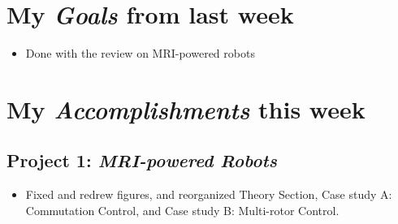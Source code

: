 \newcommand{\handoutName}{Weekly report}
\newcommand{\handoutdate}{\today}
\newcommand{\duedate}{}



\section{My \emph{Goals} from last week}
\begin{itemize}
\item Done with the review on MRI-powered robots



\end{itemize}

\section{My \emph{Accomplishments} this week}

\subsection{Project 1: \emph{MRI-powered Robots}}

\begin{itemize}
\item Fixed and redrew figures, and reorganized Theory Section, Case study A: Commutation Control, and Case study B: Multi-rotor Control. 



\end{itemize}

%


